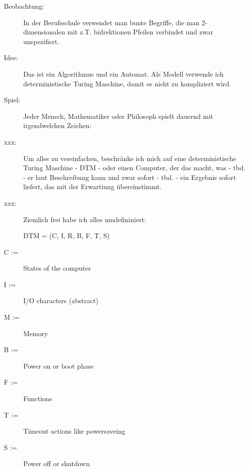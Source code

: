 \documentclass[10pt,a4paper]{article}
\begin{document}
\vskip 16pt
\begin{description}
  
\item[Beobachtung:]
In der Berufsschule verwendet man bunte Begriffe, die man
2-dimensionalen mit z.T. bidrektionen Pfeilen verbindet und
zwar unspezifiert.

\item[Idee:]
Das ist ein Algorithmus und ein Automat.
Als Modell verwende ich deterministische Turing Maschine,
damit es nicht zu kompliziert wird.

\item[Spiel:]
Jeder Mensch, Mathematiker oder Philosoph spielt dauernd mit irgendwelchen Zeichen:

\item[xxx: ]
Um alles zu vereinfachen, beschränke ich mich auf eine
deterministische Turing Maschine - DTM - oder einen Computer, der das macht,
was - tbd. - er laut Beschreibung kann und zwar sofort - tbd. - ein Ergebnis
sofort liefert, das mit der Erwartiung übereinstimmt.

\item[xxx: ]
Ziemlich frei habe ich alles umdefininiert:

DTM = (C, I, R, B, F, T, S)
\end{description}
  
\begin{description}
\item[C := ] States of the computer
\item[I := ] I/O characters (abstract)
\item[M := ] Memory
\item[B := ] Power on or boot phase
\item[F := ] Functions
\item[T := ] Timeout actions like powersaveing
\item[S := ] Power off or shutdown
\end{description}



\vskip 20pt
\end{document}
